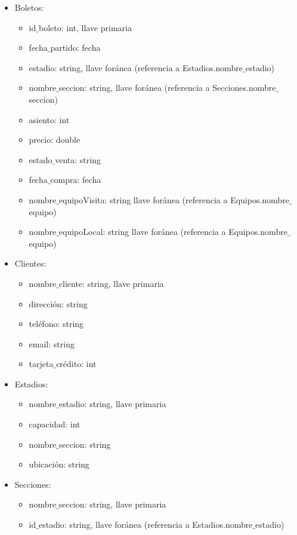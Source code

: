 \begin{itemize}
    \item Boletos:
    \begin{itemize} 
        \item id$\_$boleto: int, llave primaria
        \item fecha$\_$partido: fecha
        \item estadio: string, llave foránea (referencia a Estadios.nombre$\_$estadio)
        \item nombre$\_$seccion: string, llave foránea (referencia a Secciones.nombre$\_$seccion)
        \item asiento: int
        \item precio: double
        \item estado$\_$venta: string
        \item fecha$\_$compra: fecha
        \item nombre$\_$equipoVisita: string llave foránea (referencia a Equipos.nombre$\_$equipo)
        \item nombre$\_$equipoLocal: string llave foránea (referencia a Equipos.nombre$\_$equipo)
    \end{itemize}
    \item Clientes:
    \begin{itemize}
        \item nombre$\_$cliente: string, llave primaria
        \item dirección: string
        \item teléfono: string
        \item email: string
        \item tarjeta$\_$crédito: int
    \end{itemize}
    \item Estadios:
    \begin{itemize}
        \item nombre$\_$estadio: string, llave primaria
        \item capacidad: int
        \item nombre$\_$seccion: string
        \item ubicación: string        
    \end{itemize}
    \item Secciones:
    \begin{itemize}
        \item nombre$\_$seccion: string, llave primaria
        \item id$\_$estadio: string, llave foránea (referencia a Estadios.nombre$\_$estadio)

\end{itemize}
\end{itemize}
